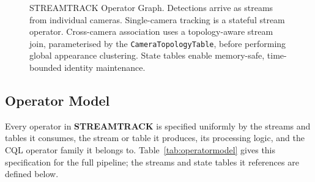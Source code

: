\documentclass[review]{elsarticle}
\begin{document}
\begin{figure}[tbh!]
{
}
\caption{STREAMTRACK Operator Graph. Detections arrive as streams from individual cameras. Single-camera tracking is a stateful stream operator. Cross-camera association uses a topology-aware stream join, parameterised by the \texttt{CameraTopologyTable}, before performing global appearance clustering. State tables enable memory-safe, time-bounded identity maintenance.}
\label{fig:architecture}
\end{figure}

\subsection{Operator Model}
\label{sec:overview:operatormodel}
Every operator in \textbf{STREAMTRACK} is specified uniformly by the streams and tables it consumes, the stream or table it produces, its processing logic, and the CQL operator
family it belongs to. Table~\ref{tab:operatormodel} gives this specification for the full pipeline; the streams and state tables it references are defined below.
\end{document}
